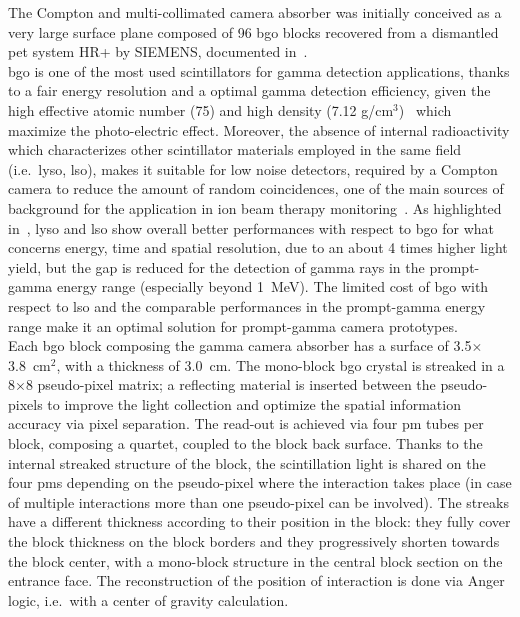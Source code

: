 The Compton and multi-collimated camera absorber was initially conceived as a very large surface plane composed of 96 \gls{bgo} blocks recovered from a dismantled \gls{pet} system HR+ by SIEMENS, documented in~\parencite{Adam1997, Brix1997}.\\ 
\gls{bgo} is one of the most used scintillators for gamma detection applications, thanks to a fair energy resolution and a optimal gamma detection efficiency, given the high effective atomic number (75) and high density (7.12 g/cm$^3$)~\parencite{Elftmann2015} which maximize the photo-electric effect. Moreover, the absence of internal radioactivity which characterizes other scintillator materials employed in the same field (i.e.~\gls{lyso}, \gls{lso}), makes it suitable for low noise detectors, required by a Compton camera to reduce the amount of random coincidences, one of the main sources of background for the application in ion beam therapy monitoring~\parencite{Ortega2015}. As highlighted in~\parencite{HuesoGonzalez2015}, \gls{lyso} and \gls{lso} show overall better performances with respect to \gls{bgo} for what concerns energy, time and spatial resolution, due to an about 4 times higher light yield, but the gap is reduced for the detection of gamma rays in the prompt-gamma energy range (especially beyond 1~MeV). The limited cost of \gls{bgo} with respect to \gls{lso} and the comparable performances in the prompt-gamma energy range make it an optimal solution for prompt-gamma camera prototypes.\\
Each \gls{bgo} block composing the gamma camera absorber has a surface of 3.5$\times$3.8~cm$^2$, with a thickness of 3.0~cm. The mono-block \gls{bgo} crystal is streaked in a 8$\times$8 pseudo-pixel matrix; a reflecting material is inserted between the pseudo-pixels to improve the light collection and optimize the spatial information accuracy via pixel separation. The read-out is achieved via four \gls{pm} tubes per block, composing a quartet, coupled to the block back surface. Thanks to the internal streaked structure of the block, the scintillation light is shared on the four \glspl{pm} depending on the pseudo-pixel where the interaction takes place (in case of multiple interactions more than one pseudo-pixel can be involved). The streaks have a different thickness according to their position in the block: they fully cover the block thickness on the block borders and they progressively shorten towards the block center, with a mono-block structure in the central block section on the entrance face. The reconstruction of the position of interaction is done via Anger logic, i.e.~with a center of gravity calculation.\\
